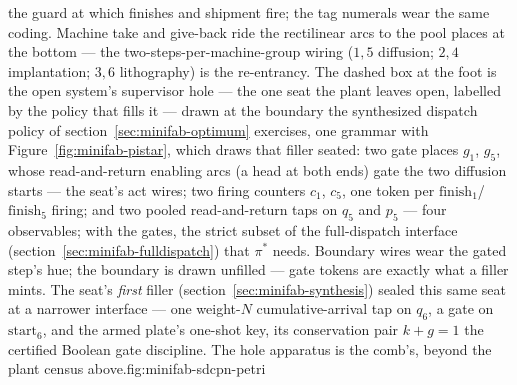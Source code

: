 \begin{landscape}
\begin{minipage}{0.94\linewidth}
{the guard at which finishes and shipment fire; the tag numerals wear
the same coding. Machine take and give-back ride
the rectilinear arcs to the pool places at the bottom --- the
two-steps-per-machine-group wiring ($1{,}5$ diffusion; $2{,}4$
implantation; $3{,}6$ lithography) is the re-entrancy. The dashed box
at the foot is the open system's supervisor hole --- the one seat the
plant leaves open, labelled by the policy that fills it --- drawn at
the boundary the synthesized dispatch policy of
section~\ref{sec:minifab-optimum} exercises, one grammar with
Figure~\ref{fig:minifab-pistar}, which draws that filler seated: two
gate places $g_1$, $g_5$, whose read-and-return enabling arcs (a head
at both ends) gate the two diffusion starts --- the seat's act wires;
two firing counters $c_1$, $c_5$, one token per
$\mathrm{finish}_1$/$\mathrm{finish}_5$ firing; and two pooled
read-and-return taps on $q_5$ and $p_5$ --- four observables; with the
gates, the strict subset of the full-dispatch interface
(section~\ref{sec:minifab-fulldispatch}) that $\pi^{\ast}$ needs.
Boundary wires wear the gated step's hue; the boundary is drawn
unfilled --- gate tokens are exactly what a filler mints. The seat's \emph{first}
filler (section~\ref{sec:minifab-synthesis}) sealed this same seat at
a narrower interface --- one weight-$N$ cumulative-arrival tap on
$q_6$, a gate on $\mathrm{start}_6$, and the armed plate's one-shot
key, its conservation pair $k + g = 1$ the certified Boolean gate
discipline. The hole apparatus is the comb's, beyond the plant census
above.}{fig:minifab-sdcpn-petri}
\end{minipage}
\par
\vspace*{\fill}
\thispagestyle{empty}
\end{landscape}
\restoregeometry
